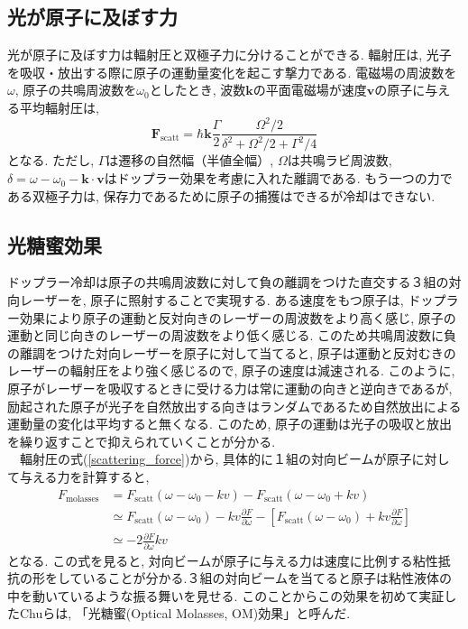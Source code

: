 \documentclass[uplatex, dvipdfmx, a4paper, report, papersize, 11pt]{jsbook}
\begin{document}
\subsection{光が原子に及ぼす力}
 光が原子に及ぼす力は輻射圧と双極子力に分けることができる. 輻射圧は, 光子を吸収・放出する際に原子の運動量変化を起こす撃力である\cite{ノーベル賞と分光学}.
 電磁場の周波数を$\omega$, 原子の共鳴周波数を$\omega_0$としたとき, 波数$\bm k$の平面電磁場が速度$\bm v$の原子に与える平均輻射圧は,
 \begin{equation}\label{scattering_force}
\bm{F} _ { \mathrm { scatt } } = \hbar \bm{k}\frac { \Gamma } { 2 } \frac { \Omega ^ { 2 } / 2 } { \delta ^ { 2 } + \Omega ^ { 2 } / 2 + \Gamma ^ { 2 } / 4 }
 \end{equation}
となる\cite{Foot:1080846}. ただし, $\Gamma$は遷移の自然幅（半値全幅）, $\Omega$は共鳴ラビ周波数, $\delta = \omega - \omega _ { 0 } - \bm{k} \cdot \bm{v}$はドップラー効果を考慮に入れた離調である. もう一つの力である双極子力は, 保存力であるために原子の捕獲はできるが冷却はできない\cite{ノーベル賞と分光学}.

\subsection{光糖蜜効果}
ドップラー冷却は原子の共鳴周波数に対して負の離調をつけた直交する３組の対向レーザーを, 原子に照射することで実現する. ある速度をもつ原子は, ドップラー効果により原子の運動と反対向きのレーザーの周波数をより高く感じ, 原子の運動と同じ向きのレーザーの周波数をより低く感じる. このため共鳴周波数に負の離調をつけた対向レーザーを原子に対して当てると, 原子は運動と反対むきのレーザーの輻射圧をより強く感じるので, 原子の速度は減速される. このように, 原子がレーザーを吸収するときに受ける力は常に運動の向きと逆向きであるが, 励起された原子が光子を自然放出する向きはランダムであるため自然放出による運動量の変化は平均すると無くなる. このため, 原子の運動は光子の吸収と放出を繰り返すことで抑えられていくことが分かる.\\
　輻射圧の式(\ref{scattering_force})から, 具体的に１組の対向ビームが原子に対して与える力を計算すると,
\begin{equation}
  \begin{split}
    F _ { \mathrm{molasses} } &= F _ { \mathrm{scatt}  } \left( \omega - \omega _ { 0 } - k v \right) - F _ {  \mathrm{scatt} }  \left( \omega - \omega _ { 0 } + k v \right)
    \\& \simeq F _ { \mathrm{scatt}  } \left( \omega - \omega _ { 0 } \right) - k v \frac { \partial F } { \partial \omega } - \left[ F _ {  \mathrm{scatt} } \left( \omega - \omega _ { 0 } \right) + k v \frac { \partial F } { \partial \omega } \right]
    \\& \simeq - 2 \frac { \partial F } { \partial \omega } k v
  \end{split}
\end{equation}
となる. この式を見ると, 対向ビームが原子に与える力は速度に比例する粘性抵抗の形をしていることが分かる.３組の対向ビームを当てると原子は粘性液体の中を動いているような振る舞いを見せる. このことからこの効果を初めて実証したChuらは, 「光糖蜜(Optical Molasses,  OM)効果」と呼んだ.
\end{document}
